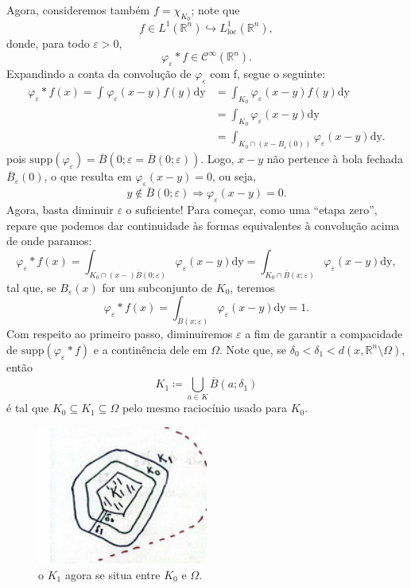 \documentclass[../distribution_theory_notes.tex]{subfiles}
\begin{document}
\begin{proof*}
	Agora, consideremos também \(f=\chi_{K_{0}}\); note que
	\[
		f\in L^{1}(\mathbb{R}^{n})\hookrightarrow L_{\mathrm{loc}}^{1}(\mathbb{R}^{n}),
	\]
	donde, para todo \(\varepsilon >0\),
	\[
		\varphi_{\varepsilon }*f\in \mathcal{C}^{\infty}(\mathbb{R}^{n}).
	\]
	Expandindo a conta da convolução de \(\varphi_\varepsilon \) com f, segue o seguinte:
	\begin{align*}
		\varphi_\varepsilon *f(x)=\int_{}^{}\varphi_\varepsilon (x-y)f(y) \mathrm{dy} & = \int_{K_{0}}^{}\varphi_\varepsilon (x-y)f(y) \mathrm{dy}                        \\
		                                                                              & = \int_{K_{0}}^{}\varphi_\varepsilon (x-y) \mathrm{dy}                            \\
		                                                                              & = \int_{K_{0}\cap (x-B_\varepsilon (0))}^{}\varphi_\varepsilon (x-y) \mathrm{dy}.
	\end{align*}
	pois \(\mathrm{supp}(\varphi_\varepsilon )=\overline{B}(0;\varepsilon =\overline{B}(0; \varepsilon ))\). Logo, \(x-y\) não pertence à bola fechada \(\overline{B}_\varepsilon (0)\), o que resulta em \(\varphi_\varepsilon (x-y)=0\), ou seja,
	\[
		y\not\in \overline{B}(0; \varepsilon )\Rightarrow \varphi_\varepsilon (x-y)=0.
	\]
	Agora, basta diminuir \(\varepsilon \) o suficiente! Para começar, como uma ``etapa zero'', repare que podemos dar continuidade às formas equivalentes à convolução acima de onde paramos:
	\[
		\varphi_\varepsilon *f(x)=\int_{K_{0}\cap (x-)\overline{B}(0; \varepsilon )}^{}\varphi_\varepsilon (x-y) \mathrm{dy} = \int_{K_{0}\cap \overline{B}(x; \varepsilon )}^{} \varphi_\varepsilon (x-y)\mathrm{dy},
	\]
	tal que, se \(B_\varepsilon (x)\) for um subconjunto de \(K_{0}\), teremos
	\[
		\varphi_\varepsilon *f(x)=\int_{\overline{B}(x; \varepsilon )}^{}\varphi_\varepsilon (x-y) \mathrm{dy}=1.
	\]
	Com respeito ao primeiro passo, diminuiremos \(\varepsilon \) a fim de garantir a compacidade de \(\mathrm{supp}(\varphi_\varepsilon *f)\) e a continência dele em \(\Omega \). Note que, se \(\delta_0<\delta_1<d(x, \mathbb{R}^{n}\setminus{\Omega }) \), então
	\[
		K_1\coloneqq \bigcup_{a\in K}^{}\overline{B}(a;\delta_1)
	\]
	é tal que \(K_{0}\subseteq K_1\subseteq \Omega \) pelo mesmo raciocínio usado para \(K_{0}\).
	\begin{figure}[H]
		\begin{center}
			\includegraphics[height=0.5\textheight, width=0.5\textwidth, keepaspectratio]{./Images/covering_k_09.png}
		\end{center}
		\caption{o \(K_1\) agora se situa entre \(K_0\) e \(\Omega\).}
	\end{figure}


\end{proof*}
\end{document}
